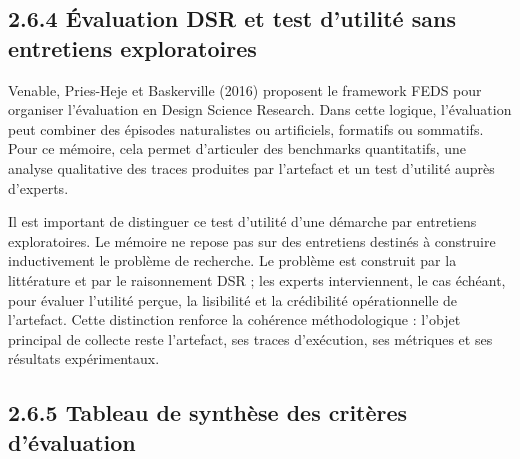 \subsection{2.6.4 Évaluation DSR et test d'utilité sans entretiens exploratoires}\label{uxe9valuation-dsr-et-test-dutilituxe9-sans-entretiens-exploratoires}

Venable, Pries-Heje et Baskerville (2016) proposent le framework FEDS pour organiser l'évaluation en Design Science Research. Dans cette logique, l'évaluation peut combiner des épisodes naturalistes ou artificiels, formatifs ou sommatifs. Pour ce mémoire, cela permet d'articuler des benchmarks quantitatifs, une analyse qualitative des traces produites par l'artefact et un test d'utilité auprès d'experts.

Il est important de distinguer ce test d'utilité d'une démarche par entretiens exploratoires. Le mémoire ne repose pas sur des entretiens destinés à construire inductivement le problème de recherche. Le problème est construit par la littérature et par le raisonnement DSR ; les experts interviennent, le cas échéant, pour évaluer l'utilité perçue, la lisibilité et la crédibilité opérationnelle de l'artefact. Cette distinction renforce la cohérence méthodologique : l'objet principal de collecte reste l'artefact, ses traces d'exécution, ses métriques et ses résultats expérimentaux.

\subsection{2.6.5 Tableau de synthèse des critères d'évaluation}\label{tableau-de-synthuxe8se-des-crituxe8res-duxe9valuation}

